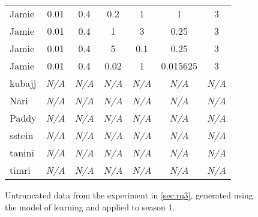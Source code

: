 \begin{figure}[h]
\begin{tabular}{l c c c c c c}
Jamie & 0.01 & 0.4 & 0.2 & 1 & 1 & 3 \\
Jamie & 0.01 & 0.4 & 1 & 3 & 0.25 & 3 \\
Jamie & 0.01 & 0.4 & 5 & 0.1 & 0.25 & 3 \\
Jamie & 0.01 & 0.4 & 0.02 & 1 & 0.015625 & 3 \\
kubajj & \emph{N/A} & \emph{N/A} & \emph{N/A} & \emph{N/A} & \emph{N/A} & \emph{N/A} \\
Nari & \emph{N/A} & \emph{N/A} & \emph{N/A} & \emph{N/A} & \emph{N/A} & \emph{N/A} \\
Paddy & \emph{N/A} & \emph{N/A} & \emph{N/A} & \emph{N/A} & \emph{N/A} & \emph{N/A} \\
sstein & \emph{N/A} & \emph{N/A} & \emph{N/A} & \emph{N/A} & \emph{N/A} & \emph{N/A} \\
tanini & \emph{N/A} & \emph{N/A} & \emph{N/A} & \emph{N/A} & \emph{N/A} & \emph{N/A} \\
timri & \emph{N/A} & \emph{N/A} & \emph{N/A} & \emph{N/A} & \emph{N/A} & \emph{N/A} \\
    \end{tabular}
    \caption{Untruncated data from the experiment in \cref{sec:rq3}, generated using the \aspectoriented model of learning and applied to season 1.}
    \label{complete_exp2_result_table}
  
\end{figure}